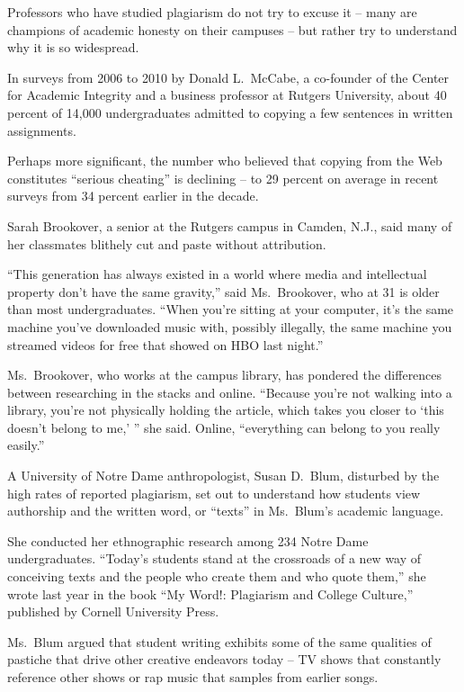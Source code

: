 ﻿\documentclass[12pt]{article}
\begin{document}
Professors who have studied plagiarism do not try to excuse it -- many are champions of academic
honesty on their campuses -- but rather try to understand why it is so widespread.

In surveys from 2006 to 2010 by Donald L.~McCabe, a co-founder of the Center for Academic Integrity
and a business professor at Rutgers University, about 40 percent of 14,000 undergraduates admitted
to copying a few sentences in written assignments.

Perhaps more significant, the number who believed that copying from the Web constitutes ``serious
cheating'' is declining -- to 29 percent on average in recent surveys from 34 percent earlier in the
decade.

Sarah Brookover, a senior at the Rutgers campus in Camden, N.J., said many of her classmates
blithely cut and paste without attribution.

``This generation has always existed in a world where media and intellectual property don't have the
same gravity,'' said Ms.~Brookover, who at 31 is older than most undergraduates. ``When you're
sitting at your computer, it's the same machine you've downloaded music with, possibly illegally,
the same machine you streamed videos for free that showed on HBO last night.''

Ms.~Brookover, who works at the campus library, has pondered the differences between researching in
the stacks and online. ``Because you're not walking into a library, you're not physically holding
the article, which takes you closer to `this doesn't belong to me,' '' she said. Online,
``everything can belong to you really easily.''

A University of Notre Dame anthropologist, Susan D.~Blum, disturbed by the high rates of reported
plagiarism, set out to understand how students view authorship and the written word, or ``texts'' in
Ms.~Blum's academic language.

She conducted her ethnographic research among 234 Notre Dame undergraduates. ``Today's students
stand at the crossroads of a new way of conceiving texts and the people who create them and who
quote them,'' she wrote last year in the book ``My Word!: Plagiarism and College Culture,''
published by Cornell University Press.

Ms.~Blum argued that student writing exhibits some of the same qualities of pastiche that drive
other creative endeavors today -- TV shows that constantly reference other shows or rap music that
samples from earlier songs.
\end{document}
